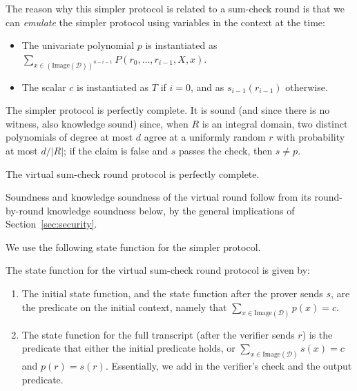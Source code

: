 The reason why this simpler protocol is related to a sum-check round is that we can \emph{emulate} the simpler protocol using variables in the context at the time:
\begin{itemize}
    \item The univariate polynomial $p$ is instantiated as $\sum_{x \in (\text{Image}(\mathcal{D}))^{n - i - 1}} P(r_0, \ldots, r_{i - 1}, X, x)$.
    \item The scalar $c$ is instantiated as $T$ if $i = 0$, and as $s_{i - 1}(r_{i - 1})$ otherwise.
\end{itemize}

The simpler protocol is perfectly complete. It is sound (and since there is no
witness, also knowledge sound) since, when $R$ is an integral domain, two distinct polynomials of
degree at most $d$ agree at a uniformly random $r$ with probability at most $d / |R|$; if the
claim is false and $s$ passes the check, then $s \neq p$.

\begin{theorem}
    The virtual sum-check round protocol is perfectly complete.
    \label{thm:virtual_sumcheck_round_protocol_complete}
    \leanok
\end{theorem}

Soundness and knowledge soundness of the virtual round follow from its round-by-round knowledge
soundness below, by the general implications of Section~\ref{sec:security}.

We use the following state function for the simpler protocol.

\begin{definition}
    \label{def:virtual_sumcheck_round_protocol_state_function}
    The state function for the virtual sum-check round protocol is given by:
\begin{enumerate}
    \item The initial state function, and the state function after the prover sends $s$, are the
    predicate on the initial context, namely that $\sum_{x \in \text{Image}(\mathcal{D})} p(x) = c$.
    \item The state function for the full transcript (after the verifier sends $r$) is the predicate
    that either the initial predicate holds, or $\sum_{x \in \text{Image}(\mathcal{D})} s(x) = c$
    and $p(r) = s(r)$. Essentially, we add in the verifier's check and the output predicate.
\end{enumerate}
\end{definition}

